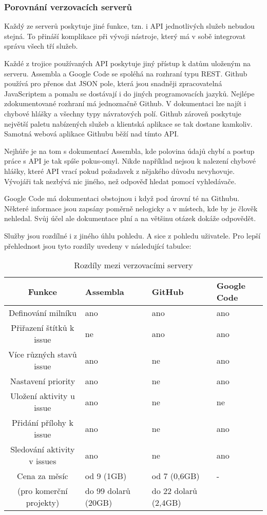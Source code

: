\subsubsection{Porovnání verzovacích serverů}

Každý ze serverů poskytuje jiné funkce, tzn. i API jednotlivých služeb nebudou stejná. To přináší komplikace při vývoji nástroje, který má v sobě integrovat správu všech tří služeb.

Každé z trojice používaných API poskytuje jiný přístup k datům uloženým na serveru. Assembla a Google Code se spoléhá na rozhraní typu REST\cite{rest}. Github používá pro přenos dat JSON\cite{json} pole, která jsou snadněji zpracovatelná JavaScriptem a pomalu se dostávají i do jiných programovacích jazyků. Nejlépe zdokumentované rozhraní má jednoznačně Github. V dokumentaci lze najít i chybové hlášky a všechny typy návratových polí. Github zároveň poskytuje největší paletu nabízených služeb a klientská aplikace se tak dostane kamkoliv. Samotná webová aplikace Githubu běží nad tímto API.

Nejhůře je na tom s dokumentací Assembla, kde polovina údajů chybí a postup práce s API je tak spíše pokus-omyl. Nikde například nejsou k nalezení chybové hlášky, které API vrací pokud požadavek z nějakého důvodu nevyhovuje. Vývojáři tak nezbývá nic jiného, než odpověď hledat pomocí vyhledávače.

Google Code má dokumentaci obstojnou i když pod úrovní té na Githubu. Některé informace jsou zapsány poměrně nelogicky a v místech, kde by je člověk nehledal. Svůj účel ale dokumentace plní a na většinu otázek dokáže odpovědět.

Služby jsou rozdílné i z jiného úhlu pohledu. A sice z pohledu uživatele. Pro lepší přehlednost jsou tyto rozdíly uvedeny v následující tabulce:

\begin{table}
\begin{center}
	\begin{tabular}{|c||l|l|l|}
	\hline
	Funkce & Assembla & GitHub & Google Code \\
	\hline
	\hline
	Definování milníku & ano & ano & ano \\
	Přiřazení štítků k issue & ne & ano & ano \\
	Více různých stavů issue & ano & ne & ano \\
	Nastavení priority & ano & ne & ano \\
	Uložení aktivity u issue & ano & ne & ne \\
	Přidání přílohy k issue & ano & ne & ano \\
	Sledování aktivity v issues & ano & ne & ano \\
	\hline
	Cena za měsíc & od 9 (1GB) & od 7 (0,6GB) & - \\
	(pro komerční projekty) & do 99 dolarů (20GB) & do 22 dolarů (2,4GB) & \\
	\hline
	\end{tabular}
\end{center}
\caption{Rozdíly mezi verzovacími servery}
\label{tab:versionSystemsDifference}
\end{table}

